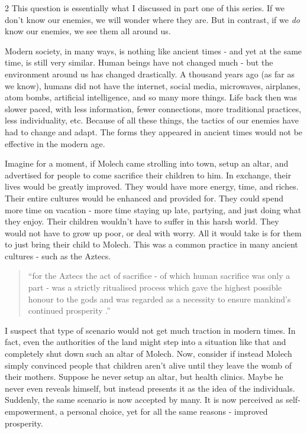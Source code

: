 \documentclass[10pt]{article}
\begin{document}
\begin{multicols}{2}
This question is essentially what I discussed in part one of this series\cite{part1}. If we don't know our enemies, we will wonder where they are. But in contrast, if we \textit{do} know our enemies, we see them all around us.

Modern society, in many ways, is nothing like ancient times - and yet at the same time, is still very similar. Human beings have not changed much - but the environment around us has changed drastically. A thousand years ago (as far as we know), humans did not have the internet, social media, microwaves, airplanes, atom bombs, artificial intelligence, and so many more things. Life back then was slower paced, with less information, fewer connections\cite{Altruism}, more traditional practices, less individuality\cite{Altruism}, etc. Because of all these things, the tactics of our enemies have had to change and adapt. The forms they appeared in ancient times would not be effective in the modern age.

Imagine for a moment, if Molech came strolling into town, setup an altar, and advertised for people to come sacrifice their children to him. In exchange, their lives would be greatly improved. They would have more energy, time, and riches. Their entire cultures would be enhanced and provided for. They could spend more time on vacation - more time staying up late, partying, and just doing what they enjoy. Their children wouldn't have to suffer in this harsh world. They would not have to grow up poor, or deal with worry. All it would take is for them to just bring their child to Molech. This was a common practice in many ancient cultures - such as the Aztecs. 

\begin{quotation}
``for the Aztecs the act of sacrifice - of which human sacrifice was only a part - was a strictly ritualised process which gave the highest possible honour to the gods and was regarded as a necessity to ensure mankind's continued prosperity \cite{Aztec_sacrifice}.''
\end{quotation}

I suspect that type of scenario would not get much traction in modern times. In fact, even the authorities of the land might step into a situation like that and completely shut down such an altar of Molech. Now, consider if instead Molech simply convinced people that children aren't alive until they leave the womb of their mothers. Suppose he never setup an altar, but health clinics. Maybe he never even reveals himself, but instead presents it as the idea of the individuals. Suddenly, the same scenario is now accepted by many. It is now perceived as self-empowerment, a personal choice, yet for all the same reasons - improved prosperity.


\end{multicols}
\end{document}
